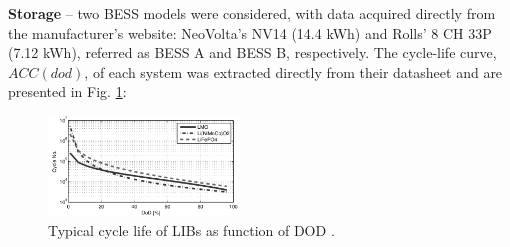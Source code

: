\documentclass{ieeeaccess}
\begin{document}
	\textbf{Storage} -- two \ac{BESS} models were considered, with data acquired directly from the manufacturer's website: NeoVolta's NV14 (14.4 kWh) and Rolls' 8 CH 33P (7.12 kWh), referred as \ac{BESS} A and \ac{BESS} B, respectively. The cycle-life curve, $ACC(dod)$, of each system was extracted directly from their datasheet and are presented in Fig. \ref{fig:acc_curves2}:
	\begin{figure}[htbp]
		\centering
		\includegraphics[width=0.45\textwidth]{figures/acc_curves1.png}
		\caption{Typical cycle life of \acp{LIB} as function of \ac{DOD} \cite{XU2016}.}
		\label{fig:acc_curves2}
	\end{figure}
    
\end{document}
